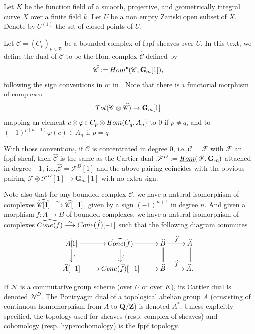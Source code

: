 \documentclass[11pt]{article}
\newcommand{\ie}{i.e.,\xspace}
\newcommand{\resp}{resp.\xspace}
\let\mathcal\mathscr
\newcommand\To[1]{\mathchoice{\xrightarrow{\textstyle\kern4pt#1\kern3pt}}{\stackrel{#1}{\longrightarrow}}{}{}}
\newcommand{\sbullet}{{\scriptscriptstyle\bullet}}
\theoremstyle{plain}
\theoremstyle{definition}
\newcommand \ZZ {\mathbf{Z}}
\newcommand \QQ {\mathbf{Q}}
\newcommand \Gm {\mathbf{G}_m}\let\G\Gm
\newcommand\cF {\mathcal{F}}
\newcommand\cN {\mathcal{N}}
\newcommand \cC {\mathcal{C}}
\begin{document}
Let $K$ be the function field of a smooth, projective, and geometrically
integral curve $X$ over a finite field $k$. Let $U$ be a non empty
Zariski open subset of $X$. Denote by $U^{(1)}$ the set of closed points
of $U$.

Let $\cC=(C_p)_{p \in \ZZ}$
be a bounded complex of fppf sheaves over $U$. In this text, we define the dual of $\cC$ to be the Hom-complex $\widehat{\cC}$ defined by
\[
\widehat{\cC}:= \underline{\textup{Hom}}^\sbullet(\cC, \Gm[1]),
\]
following the sign conventions in \cite[Tag 0A8H]{SP} or in \cite[X.5.1]{bkiac}.
Note that there is a functorial morphism of complexes
\[
\textup{Tot}(\cC \otimes \widehat{\cC}) \to \Gm[1]
\]
mapping an element $c \otimes \varphi\!\in\!C_p \otimes \textup{Hom}(C_q, A_n)$ to $0$ if $p\!\neq\!q$, and to $(-1)^{p (n-1)} \varphi(c)\!\in\!A_n$ if $p=q$.

With those conventions, if $\cC$ is concentrated in degree $0$, \ie $\cC = \cF$ with $\cF$ an fppf sheaf, then $\widehat{\cC}$ is the same as the Cartier dual $\cF^D:= \underline{\textup{Hom}}(\cF, \Gm)$ attached in degree $-1$, \ie $\widehat{\cC} = \cF^D[1]$ and the above pairing coincides with the obvious pairing $\cF \otimes \cF^D[1] \to \Gm[1]$ with no extra sign.

Note also that for any bounded complex $\cC$, we have a natural isomorphism of complexes $\widehat{\cC[1]} \To{\sim} \widehat{\cC}[-1]$, given by a sign $(-1)^{n+1}$ in degree $n$. And given a morphism $f: A \to B$ of bounded complexes, we have a natural isomorphism of complexes $\widehat{\textup{Cone}(f)} \To{\sim} \textup{Cone}(\widehat{f})[-1]$ such that the following diagram commutes\vspace*{-3pt}
\begin{equation} \label{cone and dual}
\begin{array}{c}
\xymatrix@R=6mm{
\widehat{A[1]} \ar[r] \ar[d]^\wr & \widehat{\textup{Cone}(f)} \ar[r] \ar[d]^\wr & \widehat{B} \ar[r]^{\widehat{f}} \ar@{=}[d] & \widehat{A} \ar@{=}[d] \\
\widehat{A}[-1] \ar[r] & \textup{Cone}(\widehat{f})[-1] \ar[r] & \widehat{B} \ar[r]^{\widehat{f}} & \widehat{A}.
}
\end{array}
\end{equation}

If $\cN$ is a commutative
group scheme (over $U$ or over $K$), its Cartier dual is
denoted $\cN^D$. The Pontryagin dual of a topological abelian group
$A$ (consisting of continuous homomorphism from $A$ to $\QQ/\ZZ$) is
denoted $A^*$. Unless explicitly specified, the topology used for
sheaves (\resp complex of sheaves) and cohomology (\resp hypercohomology) is the fppf topology.
\end{document}
